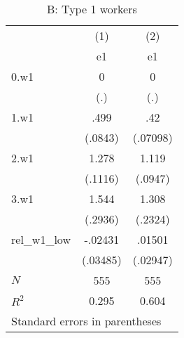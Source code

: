 \begin{table}[htbp]\centering
\caption{B: Type 1 workers}
\begin{tabular}{l*{2}{c}}
\hline\hline
            &\multicolumn{1}{c}{(1)}&\multicolumn{1}{c}{(2)}\\
            &\multicolumn{1}{c}{e1}&\multicolumn{1}{c}{e1}\\
\hline
0.w1        &           0&           0\\
            &         (.)&         (.)\\
[1em]
1.w1        &        .499&         .42\\
            &     (.0843)&    (.07098)\\
[1em]
2.w1        &       1.278&       1.119\\
            &     (.1116)&     (.0947)\\
[1em]
3.w1        &       1.544&       1.308\\
            &     (.2936)&     (.2324)\\
[1em]
rel\_w1\_low  &     -.02431&      .01501\\
            &    (.03485)&    (.02947)\\
\hline
\(N\)       &         555&         555\\
\(R^{2}\)   &       0.295&       0.604\\
\hline\hline
\multicolumn{3}{l}{\footnotesize Standard errors in parentheses}\\
\end{tabular}
\end{table}
